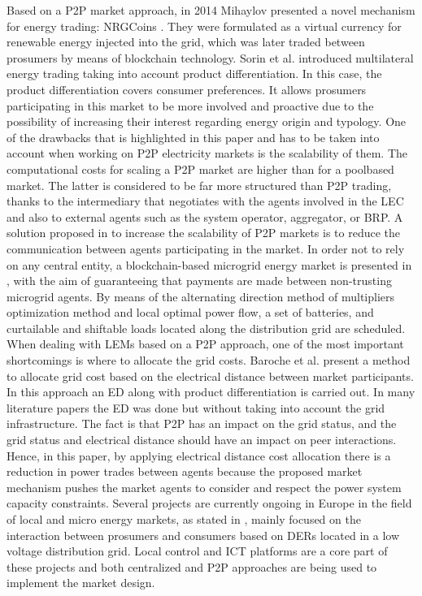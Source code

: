 Based on a P2P market approach, in 2014 Mihaylov presented a novel mechanism for energy trading: NRGCoins \cite{mihaylov2014nrg}. They were formulated as a virtual currency for renewable energy injected into the grid, which was later traded between prosumers by means of blockchain technology. Sorin et al. \cite{sorin2018consensus} introduced multilateral energy trading taking into account product differentiation. In this case, the product differentiation covers consumer preferences. It allows prosumers participating in this market to be more involved and
proactive due to the possibility of increasing their interest regarding energy origin and typology. One of the drawbacks that is highlighted in this paper and has to be taken into account when working on P2P electricity markets is the scalability of them. The computational costs for scaling a P2P market are higher than for a poolbased market. The latter is considered to be far more structured than P2P trading, thanks to the intermediary that negotiates with the agents involved in the LEC and also to external agents such as the system operator, aggregator, or BRP. A solution proposed in \cite{sorin2018consensus} to increase the scalability of P2P markets is to reduce the communication between agents participating in the market. In order not to rely on any central entity, a blockchain-based microgrid energy market is presented in \cite{munsing2017blockchains}, with the aim of guaranteeing that payments are made between non-trusting microgrid agents. By means of the alternating direction method of multipliers optimization method and local optimal power flow, a set of batteries, and curtailable and shiftable loads located along the distribution grid are scheduled. When dealing with LEMs based on a P2P approach, one of the most important shortcomings is where to allocate the grid costs. Baroche et al. \cite{baroche2018exogenous} present a method to
allocate grid cost based on the electrical distance between market participants. In this approach an ED along with product differentiation is carried out. In many literature papers the ED was done but without taking into account the grid infrastructure. The fact is that P2P has an impact on the grid status, and the grid status and electrical distance should have an impact on peer interactions. Hence, in this paper, by applying electrical distance cost allocation there is a reduction in power trades between agents because the proposed market mechanism pushes the market agents to consider and respect the power system capacity constraints.
Several projects are currently ongoing in Europe in the field of local and micro energy markets, as stated in \cite{sousa2018peer}, mainly focused on the interaction between prosumers and consumers based on DERs located in a low voltage distribution grid. Local control and ICT platforms are a core part of these projects and both centralized \cite{ilieva2016design} and P2P \cite{moret2018energy, Enerchain, mihaylov2014nrgcoin} approaches are being used to implement the market design.
